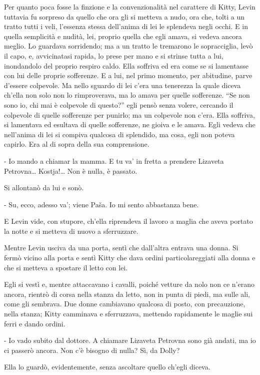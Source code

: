 Per quanto poca fosse la finzione e la convenzionalità nel carattere di Kitty, Levin tuttavia fu sorpreso da quello che ora gli si metteva a nudo, ora che, tolti a un tratto tutti i veli, l'essenza stessa dell'anima di lei le splendeva negli occhi. E in quella semplicità e nudità, lei, proprio quella che egli amava, si vedeva ancora meglio. Lo guardava sorridendo; ma a un tratto le tremarono le sopracciglia, levò il capo, e, avvicinatasi rapida, lo prese per mano e si strinse tutta a lui, inondandolo del proprio respiro caldo. Ella soffriva ed era come se si lamentasse con lui delle proprie sofferenze. E a lui, nel primo momento, per abitudine, parve d'essere colpevole. Ma nello sguardo di lei c'era una tenerezza la quale diceva ch'ella non solo non lo rimproverava, ma lo amava per quelle sofferenze. ``Se non sono io, chi mai è colpevole di questo?'' egli pensò senza volere, cercando il colpevole di quelle sofferenze per punirlo; ma un colpevole non c'era. Ella soffriva, si lamentava ed esultava di quelle sofferenze, ne gioiva e le amava. Egli vedeva che nell'anima di lei si compiva qualcosa di splendido, ma cosa, egli non poteva capirlo. Era al di sopra della sua comprensione. 

- Io mando a chiamar la mamma. E tu va' in fretta a prendere Lizaveta Petrovna\ldots{} Kostja!\ldots{} Non è nulla, è passato. 

Si allontanò da lui e sonò. 

- Su, ecco, adesso va'; viene Paša. Io mi sento abbastanza bene. 

E Levin vide, con stupore, ch'ella riprendeva il lavoro a maglia che aveva portato la notte e si metteva di nuovo a sferruzzare. 

Mentre Levin usciva da una porta, sentì che dall'altra entrava una donna. Si fermò vicino alla porta e sentì Kitty che dava ordini particolareggiati alla donna e che si metteva a spostare il letto con lei. 

Egli si vestì e, mentre attaccavano i cavalli, poiché vetture da nolo non ce n'erano ancora, rientrò di corsa nella stanza da letto, non in punta di piedi, ma sulle ali, come gli sembrava. Due donne cambiavano qualcosa di posto, con precauzione, nella stanza; Kitty camminava e sferruzzava, mettendo rapidamente le maglie sui ferri e dando ordini. 

- Io vado subito dal dottore. A chiamare Lizaveta Petrovna sono già andati, ma io ci passerò ancora. Non c'è bisogno di nulla? Sì, da Dolly? 

Ella lo guardò, evidentemente, senza ascoltare quello ch'egli diceva. 

